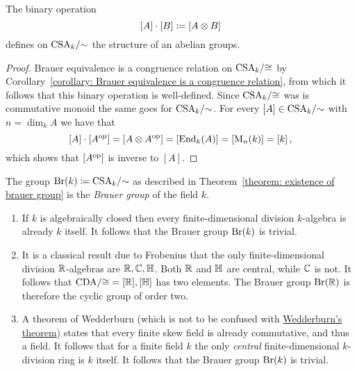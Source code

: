\begin{theorem}
  \label{theorem: existence of brauer group}
  The binary operation
  \[
              [A] \cdot [B]
    \coloneqq  [A \otimes B]
  \]
  defines on $\operatorname{CSA}_k\!/{\sim}$ the structure of an abelian groups.
\end{theorem}


\begin{proof}
  Brauer equivalence is a congruence relation on $\operatorname{CSA}_k\!/{\cong}$ by Corollary~\ref{corollary: Brauer equivalence is a congruence relation}, from which it follows that this binary operation is well-defined.
  Since $\operatorname{CSA}_k\!/{\cong}$ was is commutative monoid the same goes for $\operatorname{CSA}_k\!/{\sim}$.
  For every $[A] \in \operatorname{CSA}_k\!/{\sim}$ with $n = \dim_k A$ we have that
  \[
      [A] \cdot [A^{\mathrm{op}}]
    = [A \otimes A^{\mathrm{op}}]
    = [\operatorname{End}_k(A)]
    = [\operatorname{M}_n(k)]
    = [k] \,,
  \]
  which shows that $[A^{\mathrm{op}}]$ is inverse to $[A]$.
\end{proof}


\begin{definition}
  The group $\operatorname{Br}(k) \coloneqq \operatorname{CSA}_k\!/{\sim}$ as described in Theorem~\ref{theorem: existence of brauer group} is the \emph{Brauer group} of the field $k$.
\end{definition}


\begin{example}
  \leavevmode
  \begin{enumerate}
    \item
      If $k$ is algebraically closed then every finite-dimensional division $k$-algebra is already $k$ itself.
      It follows that the Brauer group $\operatorname{Br}(k)$ is trivial.
    \item
      It is a classical result due to Frobenius that the only finite-dimensional division $\mathbb{R}$-algebras are $\mathbb{R}, \mathbb{C}, \mathbb{H}$.
      Both $\mathbb{R}$ and $\mathbb{H}$ are central, while $\mathbb{C}$ is not.
      It follows that $\operatorname{CDA}\!/{\cong} = {[\mathbb{R}], [\mathbb{H}]}$ has two elements.
      The Brauer group $\operatorname{Br}(\mathbb{R})$ is therefore the cyclic group of order two.
    \item
      A theorem of Wedderburn (which is not to be confused with \hyperref[theorem: wedderburns theorem]{Wedderburn’s theorem}) states that every finite skew field is already commutative, and thus a field.
      It follows that for a finite field $k$ the only \emph{central} finite-dimensional $k$-division ring is $k$ itself.
      It follows that the Brauer group $\operatorname{Br}(k)$ is trivial.
  \end{enumerate}
\end{example}




